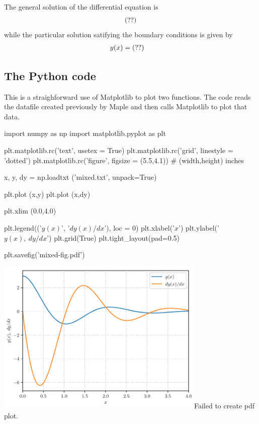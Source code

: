 \documentclass[12pt]{article}
\begin{document}
The general solution of the differential equation is
\begin{equation*}
   \mpl{ans.102}
\end{equation*}
while the particular solution satifying the boundary conditions is given by
\vspace{5pt}
\begin{align*}
    y(x) &= \mpl{ans.104}
\end{align*}

\subsection*{The Python code}

This is a straighforward use of Matplotlib to plot two functions. The code reads the datafile created previously by Maple and then calls Matplotlib to plot that data.

\begin{python}
   import numpy as np
   import matplotlib.pyplot as plt

   plt.matplotlib.rc('text', usetex = True)
   plt.matplotlib.rc('grid', linestyle = 'dotted')
   plt.matplotlib.rc('figure', figsize = (5.5,4.1)) # (width,height) inches

   x, y, dy = np.loadtxt ('mixed.txt', unpack=True)

   plt.plot (x,y)
   plt.plot (x,dy)

   plt.xlim (0.0,4.0)

   plt.legend(('$y(x)$', '$dy(x)/dx$'), loc = 0)
   plt.xlabel('$x$')
   plt.ylabel('$y(x),\> dy/dx$')
   plt.grid(True)
   plt.tight_layout(pad=0.5)

   plt.savefig('mixed-fig.pdf')
\end{python}

\vspace{10pt}

\begin{minipage}{\textwidth}
   \centering
   {\includegraphics[width=0.75\textwidth]{mixed-fig.pdf}}{Failed to create pdf plot.}
\end{minipage}
\end{document}
